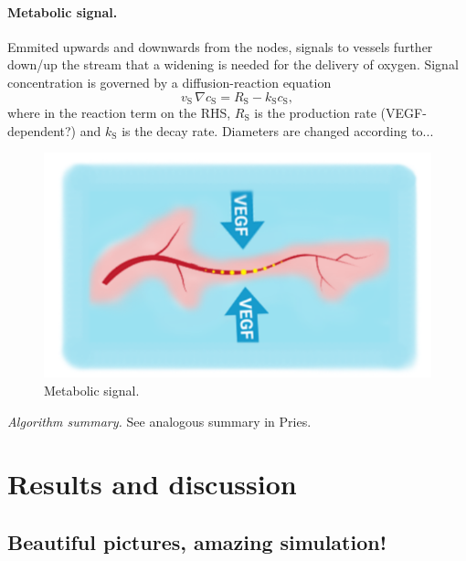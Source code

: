 \documentclass[aps,pra,a4paper,twocolumn,10pt,superscriptaddress,longbibliography]{revtex4-1}
\newcommand{\sig}{\textrm{S}}
\begin{document}
\paragraph{Metabolic signal.}
Emmited upwards and downwards from the nodes, signals to vessels further down/up the stream that a widening is needed for the delivery of oxygen. Signal concentration is governed by a diffusion-reaction equation
\begin{equation}
v_\sig \, \nabla c_\sig = R_\sig - k_\sig c_\sig,
\end{equation}
where in the reaction term on the RHS, $R_\sig$ is the production rate (VEGF-dependent?) and $k_\sig$ is the decay rate. Diameters are changed according to...
\begin{figure}[h!]
\centering
\includegraphics[width=\columnwidth]{signal-schematic.png}
\caption{Metabolic signal.}
\label{fig:signal-schematic}
\end{figure}

%
\emph{Algorithm summary.} 
See analogous summary in Pries.
%
%
\section{Results and discussion}
\label{sec:results}
%
\subsection{Beautiful pictures, amazing simulation!}
%
\end{document}
